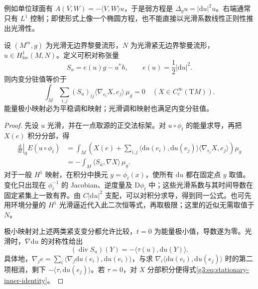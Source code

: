 \ProseParagraphBreak

例如单位球面有 \(A(V,W)=-\langle V,W\rangle u\)，于是弱方程是 \(\Delta_gu=|\mathrm du|^2u\)。右端通常只有 \(L^1\) 控制；即使形式上像一个椭圆方程，也不能直接以光滑系数线性正则性推出光滑性。

\begin{proposition}\label{g3:prop:harmonic-map-inner-variation}
	设 \((M^m,g)\) 为光滑无边界黎曼流形，\(N\) 为光滑紧无边界黎曼流形，\(u\in H^1_{\mathrm{loc}}(M,N)\)。定义可积对称张量
	\begin{equation}\label{g3:eq:harmonic-stress-tensor}
		S_u=e(u)g-u^*h,\qquad e(u)=\frac12|\mathrm du|^2.
	\end{equation}
	则内变分驻值等价于
	\begin{equation}\label{g3:eq:stationary-inner-identity}
		\int_M\sum_{i,j}(S_u)_{ij}\langle\nabla_{e_i}X,e_j\rangle\,\mu_g=0
		\quad(X\in C_c^\infty(\mathrm TM)).
	\end{equation}
	能量极小映射必为平稳调和映射；光滑调和映射也满足内变分驻值。
\end{proposition}
\begin{proof}
	先设 \(u\) 光滑，并在一点取源的正交法标架。对 \(u\circ\phi_t\) 的能量求导，再把 \(X(e)\) 积分分部，得
	\[
	\begin{aligned}
		\left.\frac{\mathrm d}{\mathrm dt}\right|_0E(u\circ\phi_t)
		&=\int_M\left(X(e)+\sum_{i,j}\langle\mathrm du(e_i),\mathrm du(e_j)\rangle
		\langle\nabla_{e_i}X,e_j\rangle\right)\mu_g\\
		&=-\int_M\langle S_u,\nabla X\rangle\,\mu_g.
	\end{aligned}
	\]
	对于一般 \(H^1\) 映射，在积分中换元 \(y=\phi_t(x)\)，使所有 \(\mathrm du\) 都在固定点 \(y\) 取值。变化只出现在 \(\phi_t^{-1}\) 的 Jacobian、逆度量及 \(\mathrm D\phi_t\) 中；这些光滑系数与其时间导数在固定紧集上一致有界。由 \(C|\mathrm du|^2\) 支配，可以对积分求导，得到同一公式。也可先用环境分量的 \(H^1\) 光滑逼近代入此二次恒等式，再取极限；这里的近似无需取值于 \(N\)。

	极小映射对上述两类紧支变分都允许比较，\(t=0\) 为能量极小值，导数遂为零。光滑时，\(\nabla\mathrm du\) 的对称性给出
	\[
		(\operatorname{div}S_u)(Y)=-\langle\tau(u),\mathrm du(Y)\rangle.
	\]
	具体地，\(\nabla_je=\sum_i\langle\nabla_j\mathrm du(e_i),\mathrm du(e_i)\rangle\)，与求 \(\nabla_i\langle\mathrm du(e_i),\mathrm du(e_j)\rangle\) 时的第二项相消，剩下 \(-\langle\tau,\mathrm du(e_j)\rangle\)。若 \(\tau=0\)，对 \(X\) 分部积分便得式\eqref{g3:eq:stationary-inner-identity}。
\end{proof}


